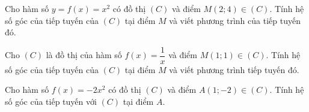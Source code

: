 \begin{bt}%

	Cho hàm số $y=f(x)=x^2$ có đồ thị $(C)$ và điểm $M(2 ; 4) \in(C)$. Tính hệ số góc của tiếp tuyến của $(C)$ tại điểm $M$ và viết phương trình của tiếp tuyến đó.
\end{bt}

\begin{bt}%

	Cho $(C)$ là đồ thị của hàm số $f(x)=\dfrac{1}{x}$ và điểm $M(1 ; 1) \in(C)$. Tính hệ số góc của tiếp tuyến của $(C)$ tại điểm $M$ và viết phương trình tiếp tuyến đó.
\end{bt}

\begin{bt}%

	Cho hàm số $f(x)=-2 x^2$ có đồ thị $(C)$ và điểm $A(1 ;-2) \in(C)$. Tính hệ số góc của tiếp tuyến với $(C)$ tại điểm $A$.
\end{bt}
